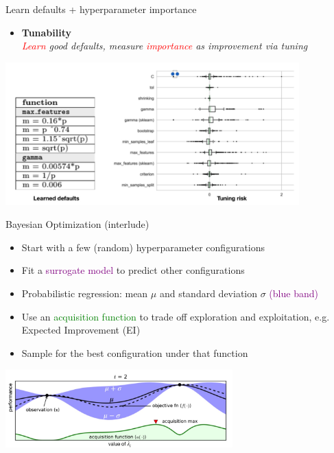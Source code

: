\documentclass[aspectratio=169,t,handout,xcolor={usenames,dvipsnames}]{beamer}
\begin{document}
\begin{frame}{Learn defaults + hyperparameter importance}

\begin{itemize}
    \item \textbf{Tunability} \\\textit{\textcolor{red}{Learn} good defaults, measure \textcolor{red}{importance} as improvement via tuning}
\end{itemize}
\centering\includegraphics[height=5.5cm]{image/Jietu20220328-201428.jpg}


\end{frame}
\begin{frame}{Bayesian Optimization (interlude)}
\begin{itemize}
    \item Start with a few (random) hyperparameter configurations
    \item Fit a \textcolor{purple}{surrogate model}  to predict other configurations
    \item Probabilistic regression: mean $\mu$ and standard deviation $\sigma$ \textcolor{purple}{(blue band)}
    \item Use an \textcolor{green}{acquisition function }to trade off exploration and exploitation, e.g. Expected Improvement (EI)
    \item Sample for the best configuration under that function
\end{itemize}
\centering\includegraphics[height=3cm]{image/Jietu20220328-201705.jpg}


\end{frame}
\end{document}
